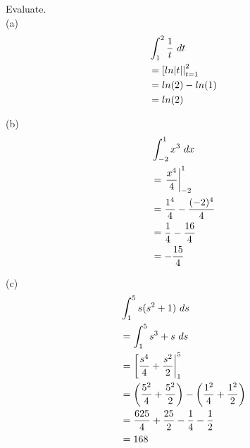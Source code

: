 \begin{exercise}\nonumber
    Evaluate. \\

    (a)
    \begin{align}
         & \int_1^2 {1 \over t} \ dt        \\
         & = \left[ ln|t| \right|_{t=1}^{2} \\
         & = ln(2) - ln(1)                  \\
         & = ln(2)                          \\
    \end{align}

    (b)
    \begin{align}
         & \int_{-2}^1 x^3 \ dx                  \\
         & = \left. {x^4 \over 4} \right|_{-2}^1 \\
         & = {1^4 \over 4} - {(-2)^4 \over 4}    \\
         & = {1 \over 4} - {16 \over 4}          \\
         & = -{15 \over 4}                       \\
    \end{align}

    (c)
    \begin{align}
         & \int_1^5 s(s^2 + 1) \ ds                                                                  \\
         & = \int_1^5 s^3 + s \ ds                                                                   \\
         & = \left[ {s^4 \over 4} + {s^2 \over 2} \right|_1^5                                        \\
         & = \left({5^2 \over 4} + {5^2 \over 2}\right) - \left({1^2 \over 4} + {1^2 \over 2}\right) \\
         & = {625 \over 4} + {25 \over 2} - {1 \over 4} - {1 \over 2}                                \\
         & = 168                                                                                     \\
    \end{align}


\end{exercise}
